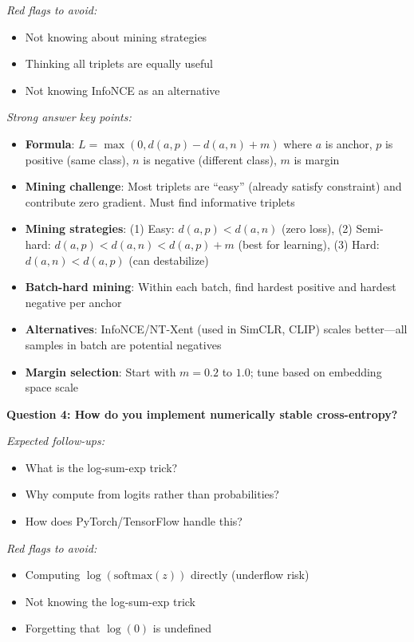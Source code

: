 \documentclass[../../main.tex]{subfiles}
\begin{document}
\begin{interviewquestions}
\textit{Red flags to avoid:}
\begin{itemize}
    \item Not knowing about mining strategies
    \item Thinking all triplets are equally useful
    \item Not knowing InfoNCE as an alternative
\end{itemize}

\textit{Strong answer key points:}
\begin{itemize}
    \item \textbf{Formula}: $L = \max(0, d(a,p) - d(a,n) + m)$ where $a$ is anchor, $p$ is positive (same class), $n$ is negative (different class), $m$ is margin
    \item \textbf{Mining challenge}: Most triplets are ``easy'' (already satisfy constraint) and contribute zero gradient. Must find informative triplets
    \item \textbf{Mining strategies}: (1) Easy: $d(a,p) < d(a,n)$ (zero loss), (2) Semi-hard: $d(a,p) < d(a,n) < d(a,p) + m$ (best for learning), (3) Hard: $d(a,n) < d(a,p)$ (can destabilize)
    \item \textbf{Batch-hard mining}: Within each batch, find hardest positive and hardest negative per anchor
    \item \textbf{Alternatives}: InfoNCE/NT-Xent (used in SimCLR, CLIP) scales better---all samples in batch are potential negatives
    \item \textbf{Margin selection}: Start with $m=0.2$ to $1.0$; tune based on embedding space scale
\end{itemize}

\vspace{0.5em}
\textbf{Question 4: How do you implement numerically stable cross-entropy?}

\textit{Expected follow-ups:}
\begin{itemize}
    \item What is the log-sum-exp trick?
    \item Why compute from logits rather than probabilities?
    \item How does PyTorch/TensorFlow handle this?
\end{itemize}

\textit{Red flags to avoid:}
\begin{itemize}
    \item Computing $\log(\text{softmax}(z))$ directly (underflow risk)
    \item Not knowing the log-sum-exp trick
    \item Forgetting that $\log(0)$ is undefined
\end{itemize}


\end{interviewquestions}
\end{document}
